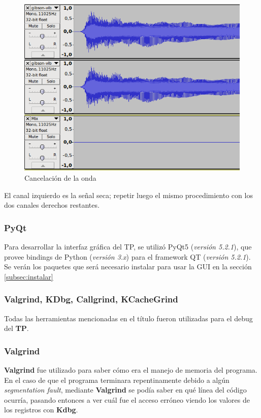 \documentclass[a4paper,spanish,12pt]{article}
\begin{document}
\begin{figure}[H]
    \centering
    \includegraphics[scale=0.70]{imagenes/audacity-no-wave.png}
    \caption{Cancelación de la onda}
    \label{fig:audacity-no-wave}
\end{figure}

El canal izquierdo es la señal seca; repetir luego el mismo procedimiento con los dos canales derechos restantes.

\subsubsection{PyQt}
Para desarrollar la interfaz gráfica del TP, se utilizó PyQt5 (\textit{versión 5.2.1}), que provee bindings de Python (\textit{versión 3.x}) para el framework QT (\textit{versión 5.2.1}). Se verán los paquetes que será necesario instalar para usar la GUI en la sección \ref{subsec:instalar}

\subsubsection{Valgrind, KDbg, Callgrind, KCacheGrind}
Todas las herramientas mencionadas en el título fueron utilizadas para el debug del \textbf{TP}.\vspace{\baselineskip} 

\subsubsection*{Valgrind}
\textbf{Valgrind} fue utilizado para saber cómo era el manejo de memoria del programa. En el caso de que el programa terminara repentinamente debido a algún \textit{segmentation fault}, mediante \textbf{Valgrind} se podía saber en qué línea del código ocurría, pasando entonces a ver cuál fue el acceso erróneo viendo los valores de los registros con \textbf{Kdbg}. 
\end{document}
